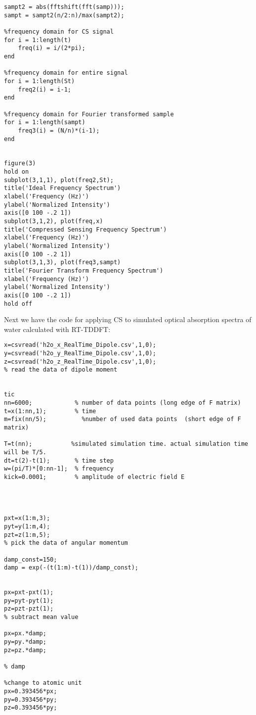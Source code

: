 \documentclass[11pt]{article}
\begin{document}
\begin{appendices}
\begin{verbatim}
sampt2 = abs(fftshift(fft(samp)));
sampt = sampt2(n/2:n)/max(sampt2);

%frequency domain for CS signal
for i = 1:length(t)
    freq(i) = i/(2*pi);
end

%frequency domain for entire signal
for i = 1:length(St)
    freq2(i) = i-1;
end

%frequency domain for Fourier transformed sample
for i = 1:length(sampt)
    freq3(i) = (N/n)*(i-1);
end


figure(3)
hold on
subplot(3,1,1), plot(freq2,St);
title('Ideal Frequency Spectrum')
xlabel('Frequency (Hz)')
ylabel('Normalized Intensity')
axis([0 100 -.2 1])
subplot(3,1,2), plot(freq,x)
title('Compressed Sensing Frequency Spectrum')
xlabel('Frequency (Hz)')
ylabel('Normalized Intensity')
axis([0 100 -.2 1])
subplot(3,1,3), plot(freq3,sampt)
title('Fourier Transform Frequency Spectrum')
xlabel('Frequency (Hz)')
ylabel('Normalized Intensity')
axis([0 100 -.2 1])
hold off
\end{verbatim}

\par Next we have the code for applying CS to simulated optical absorption spectra of water calculated with RT-TDDFT:

\begin{verbatim}
x=csvread('h2o_x_RealTime_Dipole.csv',1,0);
y=csvread('h2o_y_RealTime_Dipole.csv',1,0);
z=csvread('h2o_z_RealTime_Dipole.csv',1,0);
% read the data of dipole moment
 

tic
nn=6000;            % number of data points (long edge of F matrix)
t=x(1:nn,1);        % time
m=fix(nn/5);          %number of used data points  (short edge of F matrix)

T=t(nn);           %simulated simulation time. actual simulation time will be T/5.
dt=t(2)-t(1);       % time step
w=(pi/T)*[0:nn-1];  % frequency
kick=0.0001;        % amplitude of electric field E 

 

 
pxt=x(1:m,3);       
pyt=y(1:m,4);
pzt=z(1:m,5);
% pick the data of angular momentum
 
damp_const=150;
damp = exp(-(t(1:m)-t(1))/damp_const);

 
px=pxt-pxt(1);
py=pyt-pyt(1);
pz=pzt-pzt(1);
% subtract mean value

px=px.*damp;
py=py.*damp;
pz=pz.*damp;

% damp

%change to atomic unit
px=0.393456*px;
py=0.393456*py;
pz=0.393456*py;


\end{verbatim}
\end{appendices}
\end{document}
